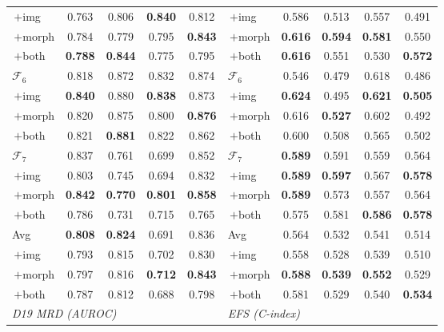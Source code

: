 \documentclass[pdflatex,sn-nature]{sn-jnl}
\begin{document}
\begin{table}[p]
\begin{tabular}{@{}l cccc @{\hskip 1.2em} l cccc@{}}
\;\,$+$img           & 0.763 & 0.806 & \textbf{0.840} & 0.812 & \;\,$+$img           & 0.586 & 0.513 & 0.557 & 0.491 \\
\;\,$+$morph         & 0.784 & 0.779 & 0.795 & \textbf{0.843} & \;\,$+$morph         & \textbf{0.616} & \textbf{0.594} & \textbf{0.581} & 0.550 \\
\;\,$+$both          & \textbf{0.788} & \textbf{0.844} & 0.775 & 0.795 & \;\,$+$both          & \textbf{0.616} & 0.551 & 0.530 & \textbf{0.572} \\
\addlinespace[2pt]
$\mathcal{F}_6$      & 0.818 & 0.872 & 0.832 & 0.874 & $\mathcal{F}_6$      & 0.546 & 0.479 & 0.618 & 0.486 \\
\;\,$+$img           & \textbf{0.840} & 0.880 & \textbf{0.838} & 0.873 & \;\,$+$img           & \textbf{0.624} & 0.495 & \textbf{0.621} & \textbf{0.505} \\
\;\,$+$morph         & 0.820 & 0.875 & 0.800 & \textbf{0.876} & \;\,$+$morph         & 0.616 & \textbf{0.527} & 0.602 & 0.492 \\
\;\,$+$both          & 0.821 & \textbf{0.881} & 0.822 & 0.862 & \;\,$+$both          & 0.600 & 0.508 & 0.565 & 0.502 \\
\addlinespace[2pt]
$\mathcal{F}_7$      & 0.837 & 0.761 & 0.699 & 0.852 & $\mathcal{F}_7$      & \textbf{0.589} & 0.591 & 0.559 & 0.564 \\
\;\,$+$img           & 0.803 & 0.745 & 0.694 & 0.832 & \;\,$+$img           & \textbf{0.589} & \textbf{0.597} & 0.567 & \textbf{0.578} \\
\;\,$+$morph         & \textbf{0.842} & \textbf{0.770} & \textbf{0.801} & \textbf{0.858} & \;\,$+$morph         & \textbf{0.589} & 0.573 & 0.557 & 0.564 \\
\;\,$+$both          & 0.786 & 0.731 & 0.715 & 0.765 & \;\,$+$both          & 0.575 & 0.581 & \textbf{0.586} & \textbf{0.578} \\
\addlinespace[2pt]
Avg & \textbf{0.808} & \textbf{0.824} & 0.691 & 0.836 & Avg & 0.564 & 0.532 & 0.541 & 0.514 \\
\;\,$+$img & 0.793 & 0.815 & 0.702 & 0.830 & \;\,$+$img & 0.558 & 0.528 & 0.539 & 0.510 \\
\;\,$+$morph & 0.797 & 0.816 & \textbf{0.712} & \textbf{0.843} & \;\,$+$morph & \textbf{0.588} & \textbf{0.539} & \textbf{0.552} & 0.529 \\
\;\,$+$both & 0.787 & 0.812 & 0.688 & 0.798 & \;\,$+$both & 0.581 & 0.529 & 0.540 & \textbf{0.534} \\
\midrule
\multicolumn{5}{l}{\textit{D19 MRD (AUROC)}} & \multicolumn{5}{l}{\textit{EFS (C-index)}} \\

\end{tabular}
\end{table}
\end{document}
